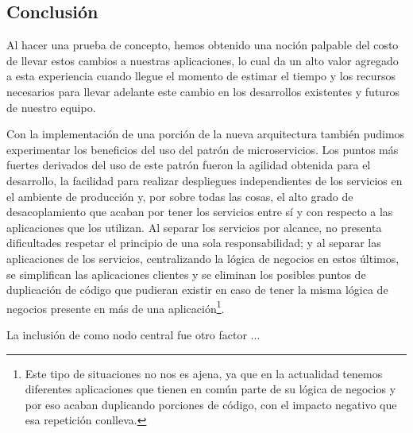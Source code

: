 \subsection{Conclusión}
\label{conclusion}


Al hacer una prueba de concepto, hemos obtenido una noción palpable del costo de llevar estos cambios a nuestras aplicaciones, lo cual da un alto valor agregado a esta experiencia cuando llegue el momento de estimar el tiempo y los recursos necesarios para llevar adelante este cambio en los desarrollos existentes y futuros de nuestro equipo.

Con la implementación de una porción de la nueva arquitectura también pudimos experimentar los beneficios del uso del patrón de microservicios. Los puntos más fuertes derivados del uso de este patrón fueron la agilidad obtenida para el desarrollo, la facilidad para realizar despliegues independientes de los servicios en el ambiente de producción y, por sobre todas las cosas, el alto grado de desacoplamiento que acaban por tener los servicios entre sí y con respecto a las aplicaciones que los utilizan. Al separar los servicios por alcance, no presenta dificultades respetar el principio de una sola responsabilidad; y al separar las aplicaciones de los servicios, centralizando la lógica de negocios en estos últimos, se simplifican las aplicaciones clientes y se eliminan los posibles puntos de duplicación de código que pudieran existir en caso de tener la misma lógica de negocios presente en más de una aplicación\footnote{Este tipo de situaciones no nos es ajena, ya que en la actualidad tenemos diferentes aplicaciones que tienen en común parte de su lógica de negocios y por eso acaban duplicando porciones de código, con el impacto negativo que esa repetición conlleva.}.

La inclusión de  como nodo central fue otro factor ...
